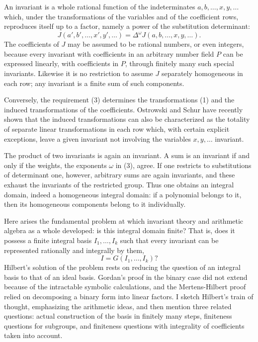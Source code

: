 \documentclass[12pt]{article}
\begin{document}
An invariant is a whole rational function of the indeterminates $a,b,\ldots,x,y,\ldots$ which, under the transformations of the variables and of the coefficient rows, reproduces itself up to a factor, namely a power of the substitution determinant:
\begin{equation}
  J(a',b',\ldots,x',y',\ldots)=\Delta^\omega J(a,b,\ldots,x,y,\ldots).              \tag{3}
\end{equation}
The coefficients of $J$ may be assumed to be rational numbers, or even integers, because every invariant with coefficients in an arbitrary number field $P$ can be expressed linearly, with coefficients in $P$, through finitely many such special invariants. Likewise it is no restriction to assume $J$ separately homogeneous in each row; any invariant is a finite sum of such components.

Conversely, the requirement (3) determines the transformations (1) and the induced transformations of the coefficients. Ostrowski and Schur have recently shown that the induced transformations can also be characterized as the totality of separate linear transformations in each row which, with certain explicit exceptions, leave a given invariant not involving the variables $x,y,\ldots$ invariant.

The product of two invariants is again an invariant. A sum is an invariant if and only if the weights, the exponents $\omega$ in (3), agree. If one restricts to substitutions of determinant one, however, arbitrary sums are again invariants, and these exhaust the invariants of the restricted group. Thus one obtains an integral domain, indeed a homogeneous integral domain: if a polynomial belongs to it, then its homogeneous components belong to it individually.

Here arises the fundamental problem at which invariant theory and arithmetic algebra as a whole developed: is this integral domain finite? That is, does it possess a finite integral basis $I_1,\ldots,I_k$ such that every invariant can be represented rationally and integrally by them,
\[
  I=G(I_1,\ldots,I_k)?
\]
Hilbert's solution of the problem rests on reducing the question of an integral basis to that of an ideal basis. Gordan's proof in the binary case did not extend because of the intractable symbolic calculations, and the Mertens-Hilbert proof relied on decomposing a binary form into linear factors. I sketch Hilbert's train of thought, emphasizing the arithmetic ideas, and then mention three related questions: actual construction of the basis in finitely many steps, finiteness questions for subgroups, and finiteness questions with integrality of coefficients taken into account.
\end{document}
